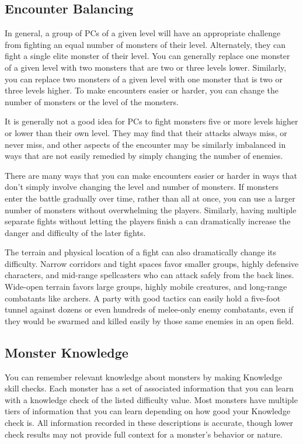   \subsection{Encounter Balancing}\label{Encounter Balancing}
    In general, a group of PCs of a given level will have an appropriate challenge from fighting an equal number of monsters of their level.
    Alternately, they can fight a single elite monster of their level.
    You can generally replace one monster of a given level with two monsters that are two or three levels lower.
    Similarly, you can replace two monsters of a given level with one monster that is two or three levels higher.
    To make encounters easier or harder, you can change the number of monsters or the level of the monsters.

    It is generally not a good idea for PCs to fight monsters five or more levels higher or lower than their own level.
    They may find that their attacks always miss, or never miss, and other aspects of the encounter may be similarly imbalanced in ways that are not easily remedied by simply changing the number of enemies.

    There are many ways that you can make encounters easier or harder in ways that don't simply involve changing the level and number of monsters.
    If monsters enter the battle gradually over time, rather than all at once, you can use a larger number of monsters without overwhelming the players.
    Similarly, having multiple separate fights without letting the players finish a  can dramatically increase the danger and difficulty of the later fights.

    The terrain and physical location of a fight can also dramatically change its difficulty.
    Narrow corridors and tight spaces favor smaller groups, highly defensive characters, and mid-range spellcasters who can attack safely from the back lines.
    Wide-open terrain favors large groups, highly mobile creatures, and long-range combatants like archers.
    A party with good tactics can easily hold a five-foot tunnel against dozens or even hundreds of melee-only enemy combatants, even if they would be swarmed and killed easily by those same enemies in an open field.

  \subsection{Monster Knowledge}
    You can remember relevant knowledge about monsters by making Knowledge skill checks.
    Each monster has a set of associated information that you can learn with a knowledge check of the listed difficulty value.
    Most monsters have multiple tiers of information that you can learn depending on how good your Knowledge check is.
    All information recorded in these descriptions is accurate, though lower check results may not provide full context for a monster's behavior or nature.

